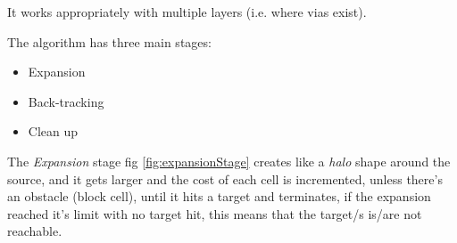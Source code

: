     It works appropriately with multiple layers (i.e. where vias exist).

    The algorithm has three main stages:
    \begin{itemize}
        \item Expansion
        \item Back-tracking
        \item Clean up
    \end{itemize}

    The \textit{Expansion} stage fig \ref{fig:expansionStage} creates like a \textit{halo} shape around the source,
    and it gets larger and the cost of each cell is incremented,
    unless there's an obstacle (block cell),
    until it hits a target and terminates,
    if the expansion reached it's limit with no target hit, this means that the target/s is/are not
    reachable.
